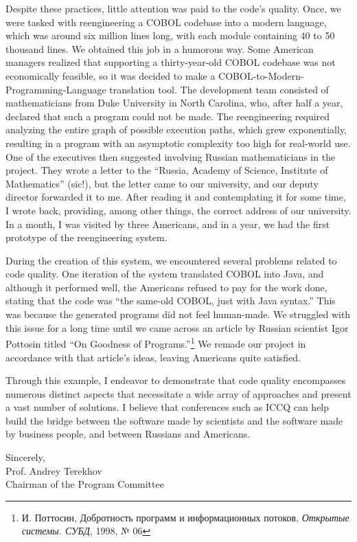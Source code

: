Despite these practices, little attention was paid to the code's quality. Once, we were tasked with reengineering a COBOL codebase into a modern language, which was around six million lines long, with each module containing 40 to 50 thousand lines. We obtained this job in a humorous way. Some American managers realized that supporting a thirty-year-old COBOL codebase was not economically feasible, so it was decided to make a COBOL-to-Modern-Programming-Language translation tool. The development team consisted of mathematicians from Duke University in North Carolina, who, after half a year, declared that such a program could not be made. The reengineering required analyzing the entire graph of possible execution paths, which grew exponentially, resulting in a program with an asymptotic complexity too high for real-world use. One of the executives then suggested involving Russian mathematicians in the project. They wrote a letter to the ``Russia, Academy of Science, Institute of Mathematics'' (sic!), but the letter came to our university, and our deputy director forwarded it to me. After reading it and contemplating it for some time, I wrote back, providing, among other things, the correct address of our university. In a month, I was visited by three Americans, and in a year, we had the first prototype of the reengineering system.

During the creation of this system, we encountered several problems related to code quality. One iteration of the system translated COBOL into Java, and although it performed well, the Americans refused to pay for the work done, stating that the code was ``the same-old COBOL, just with Java syntax.'' This was because the generated programs did not feel human-made. We struggled with this issue for a long time until we came across an article by Russian scientist Igor Pottosin titled ``On Goodness of Programs.''\footnote{\raggedright\foreignlanguage{russian}{И. Поттосин, Добротность программ и информационных потоков, \textit{Открытые системы. СУБД}, 1998, № 06}} We remade our project in accordance with that article's ideas, leaving Americans quite satisfied.

Through this example, I endeavor to demonstrate that code quality encompasses numerous distinct aspects that necessitate a wide array of approaches and present a vast number of solutions. I believe that conferences such as ICCQ can help build the bridge between the software made by scientists and the software made by business people, and between Russians and Americans.

\vspace{18pt}
Sincerely,\\
Prof. Andrey Terekhov\\
Chairman of the Program Committee \\
